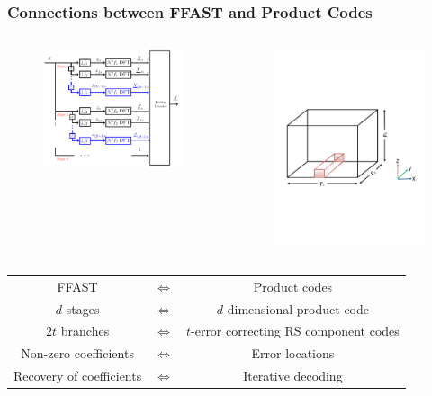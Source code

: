 \documentclass[10pt,xcolor=table]{beamer}
\begin{document}

\begin{frame}\frametitle{Connections between FFAST and Product Codes}
\begin{columns}
\begin{figure}[t]
\centering
\includegraphics[width=2.2in]{FFAST_2stages_generalized}
\end{figure}
\vspace{-6mm}
\hspace{-1.5in}

\begin{figure}[t]
\includegraphics[width=2.4in]{less-sparse}
\end{figure}
\end{columns}

\begin{tabular}{ccc}
FFAST & $\Leftrightarrow$ & Product codes \\
$d$ stages & $\Leftrightarrow$ & $d$-dimensional product code \\
$2t$ branches & $\Leftrightarrow$ & $t$-error correcting RS component codes \\
Non-zero coefficients & $\Leftrightarrow$ & Error locations \\
Recovery of coefficients & $\Leftrightarrow$ & Iterative decoding
\end{tabular}


\end{frame}
\end{document}
